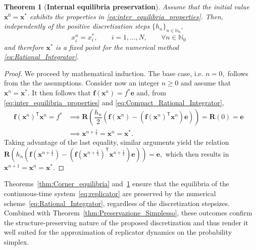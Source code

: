 \documentclass[11pt,letterpaper]{article}
\newtheorem{theorem}{Theorem}[section]
\theoremstyle{remark}
\begin{document}
\begin{theorem}[\textbf{Internal equilibria preservation}]\label{thm:Internal_Equilibria}
    Assume that the initial value $\bm{x}^0=\bm{x}^*$ exhibits the properties in \eqref{eq:inter_equilibria_properties}. Then, independently of the positive discretization steps $\{h_n\}_{n\in \mathbb{N}_0},$ 
    \begin{equation*}
        x_i^{n}=x_i^*, \qquad i=1,\dots,N, \qquad \forall n \in \mathbb{N}_0
    \end{equation*}
    and therefore $\bm{x}^*$ is a fixed point for the numerical method \eqref{eq:Rational_Integrator}.
\end{theorem}
\begin{proof}
    We proceed by mathematical induction. The base case, i.e. $n=0,$ follows from the the assumptions. Consider now an integer $n\geq 0$ and assume that $\bm{x}^n=\bm{x}^*.$ It then follows that $\bm{f}(\bm{x}^n)=f^*\bm{e}$ and, from \eqref{eq:inter_equilibria_properties} and \eqref{eq:Compact_Rational_Integrator},  
    \begin{equation*}
        \begin{split}
            \bm{f}(\bm{x}^n)^\mathsf{T}\bm{x}^n=f^* &\implies \bm{R}\left(\dfrac{h_n}{2} \left( \bm{f}(\bm{x}^n) - \left(\bm{f}(\bm{x}^n)^\mathsf{T}\bm{x}^n \right) \bm{e} \right)\right)=\bm{R}(0)=\bm{e} \\
            &\implies \bm{x}^{n+\frac{1}{2}}=\bm{x}^n=\bm{x}^*.
        \end{split}
    \end{equation*}
    Taking advantage of the last equality, similar arguments yield the relation $\bm{R} \left( h_n \left( \bm{f}(\bm{x}^{n+\frac{1}{2}}) - \left( \bm{f}(\bm{x}^{n+\frac{1}{2}})^{\mathsf{T}} \bm{x}^{n+\frac{1}{2}} \right) \bm{e} \right) \right)=\bm{e},$ which then results in $\bm{x}^{n+1}=\bm{x}^n=\bm{x}^*.$
\end{proof}

Theorems~\ref{thm:Corner_equilibria} and~\ref{thm:Internal_Equilibria} ensure that the equilibria of the continuous-time system~\eqref{eq:replicator} are preserved by the numerical scheme~\eqref{eq:Rational_Integrator}, regardless of the discretization stepsizes. Combined with Theorem~\ref{thm:Preservazione_Simplesso}, these outcomes confirm the structure-preserving nature of the proposed discretization and thus render it well suited for the approximation of replicator dynamics on the probability simplex.
\end{document}
